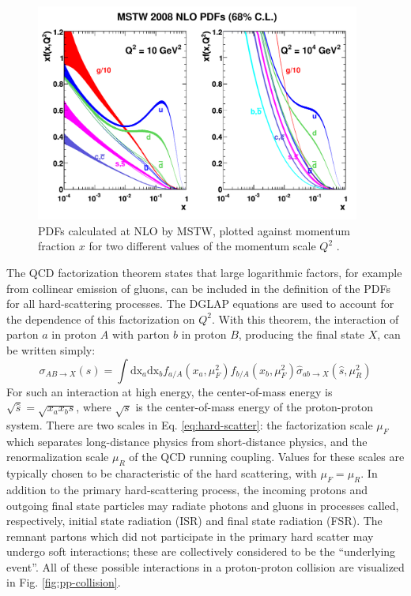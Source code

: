 \begin{figure}[hbt]
\begin{center}
\includegraphics[width=0.95\textwidth]{figures/mstw2008nlo68cl_allpdfs.pdf}
\caption{PDFs calculated at NLO by MSTW, plotted against momentum fraction $x$ for two different values of the momentum scale $Q^2$ \cite{MSTW09}.}
\label{fig:pdf-mstw}
\end{center}
\end{figure}

The QCD factorization theorem states that large logarithmic factors, for example from col\-lin\-ear emission of gluons, can be included in the definition of the PDFs for all hard-scattering processes. The DGLAP equations are used to account for the dependence of this factorization on $Q^2$. With this theorem, the interaction of parton $a$ in proton $A$ with parton $b$ in proton $B$, producing the final state $X$, can be written simply:
\begin{equation} \label{eq:hard-scatter}
\sigma_{AB \rightarrow X}(s) = \int{\text{dx}_{a}\text{dx}_{b} f_{a/A}(x_a,\mu_{F}^{2}) f_{b/A}(x_b,\mu_{F}^{2}) \hat{\sigma}_{ab \rightarrow X}(\hat{s},\mu_{R}^{2})}
\end{equation}
For such an interaction at high energy, the center-of-mass energy is $\sqrt{\hat{s}} = \sqrt{x_a x_b s}$, where $\sqrt{s}$ is the center-of-mass energy of the proton-proton system. There are two scales in Eq. \ref{eq:hard-scatter}: the factorization scale $\mu_{F}$ which separates long-distance physics from short-distance physics, and the renormalization scale $\mu_{R}$ of the QCD running coupling. Values for these scales are typically chosen to be characteristic of the hard scattering, with $\mu_{F} = \mu_{R}$. In addition to the primary hard-scattering process, the incoming protons and outgoing final state particles may radiate photons and gluons in processes called, respectively, initial state radiation (ISR) and final state radiation (FSR). The remnant partons which did not participate in the primary hard scatter may undergo soft interactions; these are collectively considered to be the ``underlying event''. All of these possible interactions in a proton-proton collision are visualized in Fig. \ref{fig:pp-collision}.

